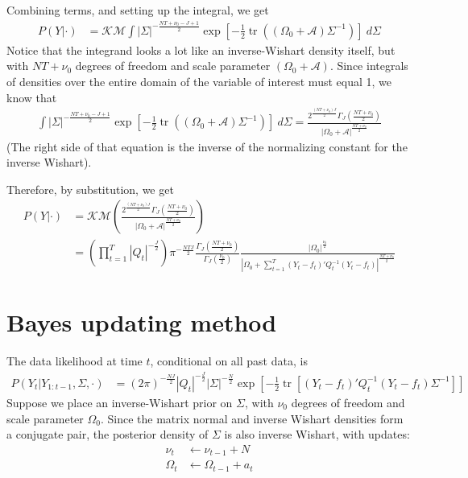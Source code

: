 \documentclass[letter,10pt]{article}
\DeclareMathOperator\tr{tr}
\newcommand{\K}{\mathcal{K}}
\newcommand{\A}{\mathcal{A}}
\newcommand{\M}{\mathcal{M}}
\begin{document}
Combining terms, and setting up the integral, we get
\begin{align}
  \label{eq:3}
  P(Y|\cdot)&=\K\M\int |\Sigma|^{-\frac{NT+\nu_0-J+1}{2}}\exp\left[-\frac{1}{2}\tr\left(\left(\Omega_0+\A\right)\Sigma^{-1}\right)\right]~d\Sigma
\end{align}
Notice that the integrand looks a lot like an inverse-Wishart density
itself, but with $NT+\nu_0$ degrees of freedom and scale parameter
$(\Omega_0+\A)$.  Since integrals of densities over the entire domain of
the variable of interest must equal 1, we know that
\begin{align}
  \label{eq:1}
 \int |\Sigma|^{-\frac{NT+\nu_0-J+1}{2}}\exp\left[-\frac{1}{2}\tr\left(\left(\Omega_0+\A\right)\Sigma^{-1}\right)\right]~d\Sigma= \frac{2^{\frac{(NT+\nu_0)J}{2}}\Gamma_J\left(\frac{NT+\nu_0}{2}\right)}{|\Omega_0+\A|^{\frac{NT+\nu_0}{2}}}
\end{align}
(The right side of that equation is the inverse of the normalizing constant for the
inverse Wishart).

Therefore, by substitution, we get
\begin{align}
  \label{eq:4}
  P(Y|\cdot)&=\K\M
  \left(\frac{2^{\frac{(NT+\nu_0)J}{2}}\Gamma_J\left(\frac{NT+\nu_0}{2}\right)}{|\Omega_0+\A|^{\frac{NT+\nu_0}{2}}}\right)\\
&=\left(\prod_{t=1}^T|Q_t|^{-\frac{J}{2}}\right)\pi^{-\frac{NTJ}{2}}\frac{\Gamma_J\left(\frac{NT+\nu_0}{2}\right)}{\Gamma_J\left(\frac{\nu_0}{2}\right)}\frac{|\Omega_0|^{\frac{\nu_0}{2}}}{|\Omega_0+\sum_{t=1}^T\left(Y_t-f_t\right)'Q_t^{-1}\left(Y_t-f_t\right)|^{\frac{NT+\nu_0}{2}}}
\end{align}


\section{Bayes updating method}

The data likelihood at time $t$, conditional on all past data, is
\begin{align}
  \label{eq:5}
  P(Y_t|Y_{1:t-1},\Sigma,\cdot)&=\left( 2\pi\right)^{-\frac{NJ}{2}}|Q_t|^{-\frac{J}{2}}|\Sigma|^{-\frac{N}{2}}\exp\left[-\frac{1}{2}\tr\left[\left(Y_t-f_t\right)
        'Q_t^{-1}\left(Y_t-f_t\right)\Sigma^{-1}\right]\right]
\end{align}
Suppose we place an inverse-Wishart prior on $\Sigma$, with $\nu_0$
degrees of freedom and scale parameter $\Omega_0$.  Since the matrix
normal and inverse Wishart densities form a conjugate pair, the
posterior density of $\Sigma$ is also inverse Wishart, with updates:
\begin{align}
  \label{eq:6}
  \nu_{t}&\leftarrow\nu_{t-1}+N\\  
\Omega_t&\leftarrow\Omega_{t-1}+a_t
\end{align}
\end{document}

